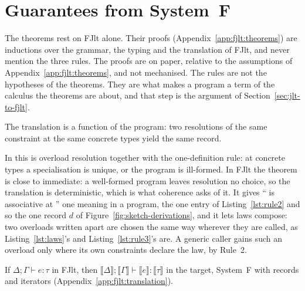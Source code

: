 \section{Guarantees from System~F}
\label{sec:guarantees}

The theorems rest on FJlt alone.
Their proofs (Appendix~\ref{app:fjlt:theorems}) are inductions over the grammar, the typing and the translation of FJlt, and never mention the three rules.
The proofs are on paper, relative to the assumptions of Appendix~\ref{app:fjlt:theorems}, and not mechanised.
The rules are not the hypotheses of the theorems.
They are what makes a \Cpp{} program a term of the calculus the theorems are about, and that step is the argument of Section~\ref{sec:jlt-to-fjlt}.

\begin{theorem}[Coherence]
\label{thm:coherence}
The translation is a function of the program: two resolutions of the same constraint at the same concrete types yield the same record.
\end{theorem}

In \Cpp{} this is overload resolution together with the one-definition rule: at concrete types a specialisation is unique, or the program is ill-formed.
In FJlt the theorem is close to immediate: a well-formed program leaves resolution no choice, so the translation is deterministic, which is what coherence asks of it.
It gives `` is associative at '' one meaning in a program, the one entry of Listing~\ref{lst:rule2} and so the one record $d$ of Figure~\ref{fig:sketch-derivations}, and it lets laws compose: two overloads written apart are chosen the same way wherever they are called, as Listing~\ref{lst:laws}'s and Listing~\ref{lst:rule3}'s  are.
A generic caller gains such an overload only where its own constraints declare the law, by Rule~2.

\begin{theorem}
\label{thm:preservation}
If $\Delta; \Gamma \vdash e : \tau$ in FJlt, then $\llbracket \Delta \rrbracket; \llbracket \Gamma \rrbracket \vdash \llbracket e \rrbracket : \llbracket \tau \rrbracket$ in the target, System~F with records and iterators (Appendix~\ref{app:fjlt:translation}).
\end{theorem}

